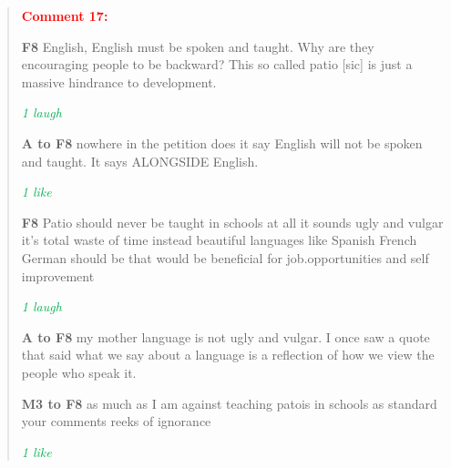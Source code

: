 \documentclass[output=paper,colorlinks,citecolor=brown]{langscibook}
\begin{document}
\begin{quote}
    \textcolor[HTML]{FF0000}{\textbf{Comment 17:}}

    \textbf{F8} English, English must be spoken and taught. Why are they encouraging people to be backward? This so called patio [sic] is just a massive hindrance to development.

    \textit{\textcolor[HTML]{00B050}{1 laugh}}

     \textbf{A to F8} nowhere in the petition does it say English will not be spoken and taught. It says ALONGSIDE English.

    \textit{\textcolor[HTML]{00B050}{1 like}}

     \textbf{F8} Patio should never be taught in schools at all it sounds ugly and vulgar it’s total waste of time instead beautiful languages like Spanish French German should be that would be beneficial for job.opportunities and self improvement

     \textit{\textcolor[HTML]{00B050}{1 laugh}}

     \textbf{A to F8} my mother language is not ugly and vulgar. I once saw a quote that said what we say about a language is a reflection of how we view the people who speak it.

     \textbf{M3 to F8} as much as I am against teaching patois in schools as standard your comments reeks of ignorance

\textit{\textcolor[HTML]{00B050}{1 like}}
\end{quote}
\end{document}

